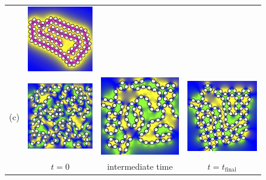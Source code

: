 \begin{figure}[h!]
\begin{center}
\begin{tabular}{m{0.1cm}m{1.8in}m{1.8in}m{1.8in}}
      &\includegraphics[width=1.8in]{figures/SpecificAim1/N100C3.jpg}    \\
    (c)
      &\includegraphics[width=1.8in]{figures/SpecificAim1/N100A1.jpg}
      &\includegraphics[width=1.8in]{figures/SpecificAim1/N100A2.jpg}
      &\includegraphics[width=1.8in]{figures/SpecificAim1/N100A3.jpg}    \\
      &\multicolumn{1}{c}{$t = 0$}
      &\multicolumn{1}{c}{intermediate time}
      &\multicolumn{1}{c}{$t = t_{\text{final}}$}
  \end{tabular}
  \end{center}
  \vspace{-20pt}
  \caption{\footnotesize
    \label{fig:self-assembly}
}
\end{figure}
